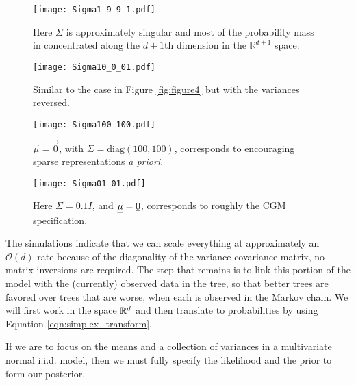\begin{figure}[ht]
\begin{minipage}[b]{0.45\linewidth}
\centering
\texttt{[image: Sigma1\_9\_9\_1.pdf]}
\caption[ALN plot $\Sigma$ numerically singular]{Here $\Sigma$ is approximately singular and most of the probability mass in concentrated along the $d+1$th dimension in the $\mathbb{R}^{d+1}$ space.  }
\label{fig:figure5}
\end{minipage}
\hspace{0.5cm}
\begin{minipage}[b]{0.45\linewidth}
\centering
\texttt{[image: Sigma10\_0\_01.pdf]}
\caption[Similar to the case in Figure \ref{fig:figure4} but with the variances reversed]{Similar to the case in Figure \ref{fig:figure4} but with the variances reversed.}
\label{fig:figure6}
\end{minipage}
\end{figure}

 \begin{figure}[ht]
\begin{minipage}[b]{0.45\linewidth}
\centering
\texttt{[image: Sigma100\_100.pdf]}
\caption[ALN plot with a zero vector mean and $\Sigma=\text{Diag}(100,100)$]{$\vec{\mu}=\vec{0}$, with
 $\Sigma= \text{diag}(100, 100)$, corresponds to encouraging sparse representations \emph{a priori}.  }
\label{fig:figure7}
\end{minipage}
\hspace{0.5cm}
\begin{minipage}[b]{0.45\linewidth}
\centering
\texttt{[image: Sigma01\_01.pdf]}
\caption[ALN plot approximating the CGM model]{Here $\Sigma=0.1I$, and $\underline{\mu}=\underline{{0}}$, corresponds to roughly the CGM specification.}
\label{fig:figure8}
\end{minipage}
\end{figure}

 The simulations indicate that we can scale everything at approximately an $\mathcal{O}(d)$ rate because of the diagonality of the variance covariance matrix, no matrix inversions are required. The step that remains is to link this portion of the model with the (currently) observed data in the tree, so that better trees are favored over trees that are worse, when each is observed in the Markov chain. We will first work in the space $\mathbb{R}^{d}$ and then translate to probabilities by using Equation \ref{eqn:simplex_transform}.  
 
 If we are to focus on the means and a collection of variances in a multivariate normal i.i.d. model, then we must fully specify the likelihood and the prior to form our posterior. 
 
